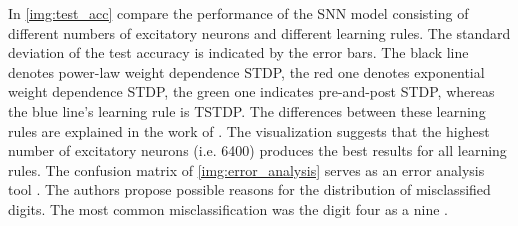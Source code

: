 In \autoref{img:test_acc} \authorsSNN{} \cite{SNN} compare the performance of the \ac{SNN} model consisting of different numbers of excitatory neurons 
and different learning rules.
The standard deviation of the test accuracy is indicated by the error bars.
The black line denotes power-law weight dependence \ac{STDP}, the red one denotes exponential weight dependence \ac{STDP}, 
the green one indicates pre-and-post \ac{STDP}, whereas the blue line's learning rule is \ac{TSTDP}.
The differences between these learning rules are explained in the work of \authorsSNN{} \cite{SNN}.
The visualization suggests that the highest number of excitatory neurons (i.e. 6400) produces the best results for all learning rules.
The confusion matrix of \autoref{img:error_analysis} serves as an error analysis tool \cite{SNN}.
The authors propose possible reasons for the distribution of misclassified digits.
The most common misclassification was the digit four as a nine \cite{SNN}.

